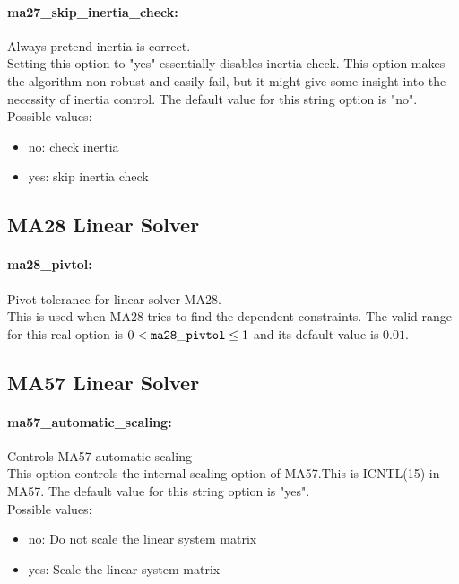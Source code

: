 \paragraph{ma27\_skip\_inertia\_check:}\label{sec:ma27_skip_inertia_check} Always pretend inertia is correct. $\;$ \\
 Setting this option to "yes" essentially disables
inertia check. This option makes the algorithm
non-robust and easily fail, but it might give
some insight into the necessity of inertia
control.
The default value for this string option is "no".
\\ 
Possible values:
\begin{itemize}
   \item no: check inertia
   \item yes: skip inertia check
\end{itemize}

\subsection{MA28 Linear Solver}
\label{sec:MA28_Linear_Solver}
\paragraph{ma28\_pivtol:}\label{sec:ma28_pivtol} Pivot tolerance for linear solver MA28. $\;$ \\
 This is used when MA28 tries to find the
dependent constraints. The valid range for this real option is 
$0 <  {\tt ma28\_pivtol } \le 1$
and its default value is $0.01$.


\subsection{MA57 Linear Solver}
\label{sec:MA57_Linear_Solver}
\paragraph{ma57\_automatic\_scaling:}\label{sec:ma57_automatic_scaling} Controls MA57 automatic scaling $\;$ \\
 This option controls the internal scaling option
of MA57.This is ICNTL(15) in MA57.
The default value for this string option is "yes".
\\ 
Possible values:
\begin{itemize}
   \item no: Do not scale the linear system matrix
   \item yes: Scale the linear system matrix
\end{itemize}

